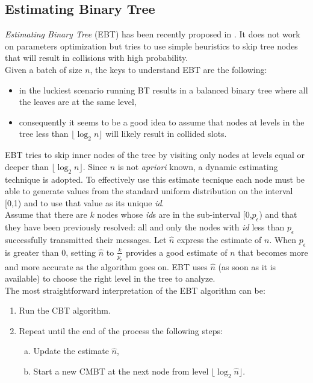 \documentclass[11pt,a4paper,twoside,openright]{book}
\newcommand{\pc}{p_{\epsilon}}
\begin{document}
\subsection{Estimating Binary Tree}
\label{se:EBT}
\emph{Estimating Binary Tree} (EBT) has been recently proposed in \cite{popovski}. It does not work on parameters optimization but tries to use simple heuristics to skip tree nodes that will result in collisions with high probability.\\
Given a batch of size $n$, the keys to understand EBT are the following:
\begin{itemize}
\item in the luckiest scenario running BT results in a balanced binary tree where all the leaves are at the same level,
\item consequently it seems to be a good idea to assume that nodes at levels in the tree less than $\lfloor \log_{2}n\rfloor$ will likely result in collided slots.
\end{itemize}

EBT tries to skip inner nodes of the tree by visiting only nodes at levels equal or deeper than $\lfloor \log_{2}n\rfloor$. Since $n$ is not \emph{apriori} known, a dynamic estimating technique is adopted. To effectively use this estimate tecnique each node must be able to generate values from the standard uniform distribution on the interval [0,1) and to use that value as its unique \emph{id}.\\
 Assume that there are $k$ nodes whose \emph{id}s are in the sub-interval [0,$\pc$) and that they have been previously resolved: all and only the nodes with \emph{id} less than $\pc$ successfully transmitted their messages.  Let $\hat{n}$ express the estimate of $n$. When $\pc$ is greater than 0, setting $\hat{n}$ to $\displaystyle\frac{k}{\pc}$ provides a good estimate of $n$ that becomes more and more accurate as the algorithm goes on. EBT uses $\hat{n}$ (as soon as it is available) to choose the right level in the tree to analyze.\\
 
 The most straightforward  interpretation of the EBT algorithm can be:
 \begin{enumerate}
\item Run the CBT algorithm.
\item Repeat until the end of the process the following steps:
\begin{enumerate}[a)]
\item Update the estimate $\hat{n}$,
\item Start a new CMBT at the next node from level $\lfloor\log_{2}\hat{n}\rfloor$.

\end{enumerate}

\end{enumerate}
\end{document}
